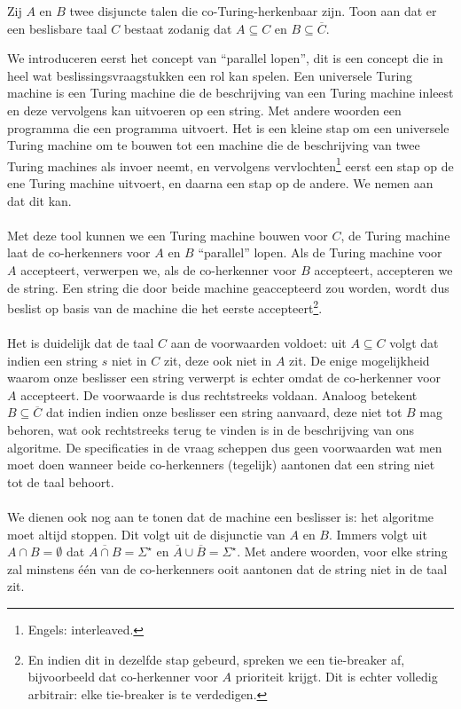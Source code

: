 \documentclass[a4paper]{article}
\begin{document}
\begin{question}
Zij $A$ en $B$ twee disjuncte talen die co-Turing-herkenbaar zijn. Toon aan dat er een beslisbare taal $C$ bestaat zodanig dat $A \subseteq C$ en $B \subseteq \overline{C}$.
\begin{answer}
We introduceren eerst het concept van ``parallel lopen'', dit is een concept die in heel wat beslissingsvraagstukken een rol kan spelen. Een universele Turing machine is een Turing machine die de beschrijving van een Turing machine inleest en deze vervolgens kan uitvoeren op een string. Met andere woorden een programma die een programma uitvoert. Het is een kleine stap om een universele Turing machine om te bouwen tot een machine die de beschrijving van twee Turing machines als invoer neemt, en vervolgens vervlochten\footnote{Engels: interleaved.} eerst een stap op de ene Turing machine uitvoert, en daarna een stap op de andere. We nemen aan dat dit kan.
\paragraph{}
Met deze tool kunnen we een Turing machine bouwen voor $C$, de Turing machine laat de co-herkenners voor $A$ en $B$ ``parallel'' lopen. Als de Turing machine voor $A$ accepteert, verwerpen we, als de co-herkenner voor $B$ accepteert, accepteren we de string. Een string die door beide machine geaccepteerd zou worden, wordt dus beslist op basis van de machine die het eerste accepteert\footnote{En indien dit in dezelfde stap gebeurd, spreken we een tie-breaker af, bijvoorbeeld dat co-herkenner voor $A$ prioriteit krijgt. Dit is echter volledig arbitrair: elke tie-breaker is te verdedigen.}.
\paragraph{}
Het is duidelijk dat de taal $C$ aan de voorwaarden voldoet: uit $A\subseteq C$ volgt dat indien een string $s$ niet in $C$ zit, deze ook niet in $A$ zit. De enige mogelijkheid waarom onze beslisser een string verwerpt is echter omdat de co-herkenner voor $A$ accepteert. De voorwaarde is dus rechtstreeks voldaan. Analoog betekent $B\subseteq\overline{C}$ dat indien indien onze beslisser een string aanvaard, deze niet tot $B$ mag behoren, wat ook rechtstreeks terug te vinden is in de beschrijving van ons algoritme. De specificaties in de vraag scheppen dus geen voorwaarden wat men moet doen wanneer beide co-herkenners (tegelijk) aantonen dat een string niet tot de taal behoort.
\paragraph{}
We dienen ook nog aan te tonen dat de machine een beslisser is: het algoritme moet altijd stoppen. Dit volgt uit de disjunctie van $A$ en $B$. Immers volgt uit $A\cap B=\emptyset$ dat $\overline{A\cap B}=\Sigma^{\star}$ en $\overline{A}\cup\overline{B}=\Sigma^{\star}$. Met andere woorden, voor elke string zal minstens \'e\'en van de co-herkenners ooit aantonen dat de string niet in de taal zit.
\end{answer}
\end{question}
\end{document}

